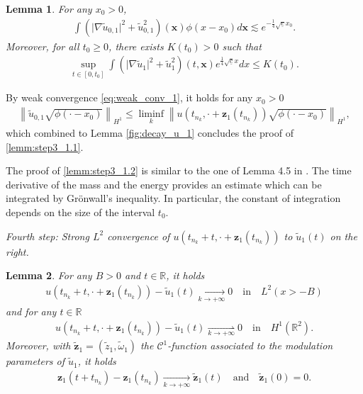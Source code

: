 \documentclass[reqno,10pt]{amsart}
\newtheorem{lemm}{Lemma}[section]
\numberwithin{equation}{section}
\newcommand{\bx}{\mathbf{x}}
\newcommand{\bz}{\mathbf{z}}
\begin{document}
		\begin{lemm}\label{lemm:step3_1}
		      For any $x_0>0$,
			\begin{align} \label{lemm:step3_1.1}
				\int \left( \vert \nabla \tilde{u}_{0,1} \vert ^2 + \tilde{u}_{0,1}^2 \right) (\bx) \phi (x-x_0) d\bx \lesssim e^{-\frac14 \sqrt{\underline{c}} x_0}.
			\end{align}
			Moreover, for all $t_0\geq 0$, there exists $K(t_0)>0$ such that
			\begin{align} \label{lemm:step3_1.2}
				\sup_{t\in [0,t_0]} \int \left(\vert \nabla \tilde{u}_1\vert^2 + \tilde{u}_1^2 \right) \left(t, \bx \right) e^{\frac14 \sqrt{\underline{c}}x} dx \leq K(t_0).
			\end{align}
		\end{lemm}
		By weak convergence \eqref{eq:weak_conv_1}, it holds for any $x_0>0$
		\begin{align*}
			\left\| \tilde{u}_{0,1} \sqrt{\phi (\cdot-x_0)} \right\|_{H^1} \leq \liminf_{k} \left\| u \left( t_{n_k}, \cdot +  \bz_1(t_{n_k}) \right) \sqrt{\phi (\cdot-x_0)} \right\|_{H^1},
		\end{align*}
		which combined to Lemma \ref{fig:decay_u_1} concludes the proof of \eqref{lemm:step3_1.1}.
		
		The proof of \eqref{lemm:step3_1.2} is similar to the one of Lemma 4.5 in \cite{CMPS16}. The time derivative of the mass and the energy provides an estimate which can be integrated by Gr\"{o}nwall's inequality. In particular, the constant of integration depends on the size of the interval $t_0$.
		
		\vspace{0.5cm}
  \noindent \textit{Fourth step: Strong $L^2$ convergence of $u \left(t_{n_k}+t, \cdot + \bz_1(t_{n_k}) \right)$ to $\tilde{u}_1(t)$ on the right.}
		
		\begin{lemm}\label{lemm:step4.1.1}
			For any $B>0$ and $t \in \mathbb{R}$, it holds
			\begin{align}\label{eq:step4.1.1}
				u \left( t_{n_k}+t, \cdot + \bz_1(t_{n_k}) \right) - \tilde{u}_1(t) \underset{k \rightarrow + \infty}{\rightarrow} 0 \quad \text{in} \quad L^2(x>-B)
			\end{align}
			and for any $t\in \mathbb{R}$
			\begin{align}\label{eq:step4.1.2}
				u \left( t_{n_k}+t, \cdot + \bz_1(t_{n_k}) \right) - \tilde{u}_{1}(t) \underset{k \rightarrow +\infty}{\rightharpoonup} 0 \quad \text{in} \quad H^1(\mathbb{R}^2).
			\end{align}
			Moreover, with $\tilde{\bz}_1=(\tilde{z}_1, \tilde{\omega}_1)$ the $\mathcal{C}^1$-function associated to the modulation parameters of $\tilde{u}_1$, it holds
			\begin{align}\label{eq:step4.1.3}
				\bz_1(t+t_{n_k}) - \bz_1(t_{n_k}) \underset{k \to +\infty}{\rightarrow} \tilde{\bz}_1(t) \quad \text{and} \quad \tilde{\bz}_1(0)=0.
			\end{align}
		\end{lemm}
		
\end{document}
